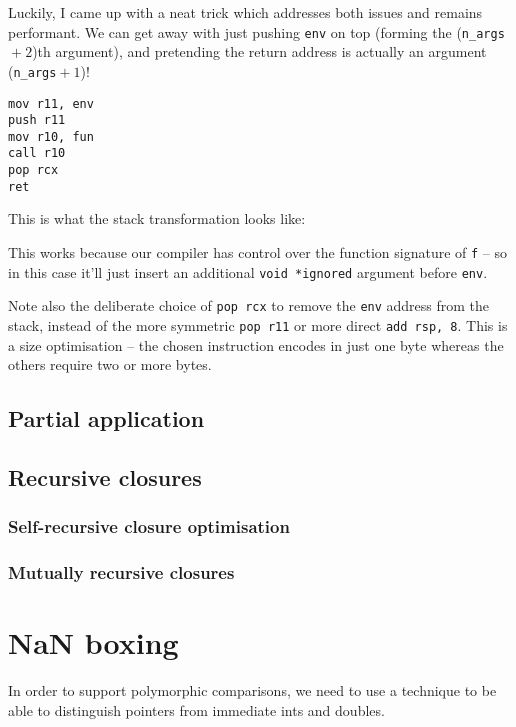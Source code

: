 \documentclass[12pt,a4paper,twoside,openright]{report}
\begin{document}
Luckily, I came up with a neat trick which addresses both issues and remains performant. We can get away with just pushing \lstinline{env} on top (forming the (\lstinline{n_args}${}+2$)th argument), and pretending the return address is actually an argument (\lstinline{n_args}${}+1$)!

\begin{lstlisting}
mov r11, env
push r11
mov r10, fun
call r10
pop rcx
ret
\end{lstlisting}

This is what the stack transformation looks like: %

This works because our compiler has control over the function signature of
\lstinline{f}
-- so in this case it'll just insert an additional \lstinline{void *ignored} argument before \lstinline{env}.

Note also the deliberate choice of \lstinline{pop rcx} to remove the \lstinline{env} address from the stack, instead of the more symmetric \lstinline{pop r11} or more direct \lstinline{add rsp, 8}. This is a size optimisation -- the chosen instruction encodes in just one byte whereas the others require two or more bytes.

\subsection{Partial application}

\subsection{Recursive closures}

\subsubsection{Self-recursive closure optimisation}

\subsubsection{Mutually recursive closures}



\section{NaN boxing}

In order to support polymorphic comparisons, we need to use a technique to be able to distinguish pointers from immediate ints and doubles.
\end{document}
